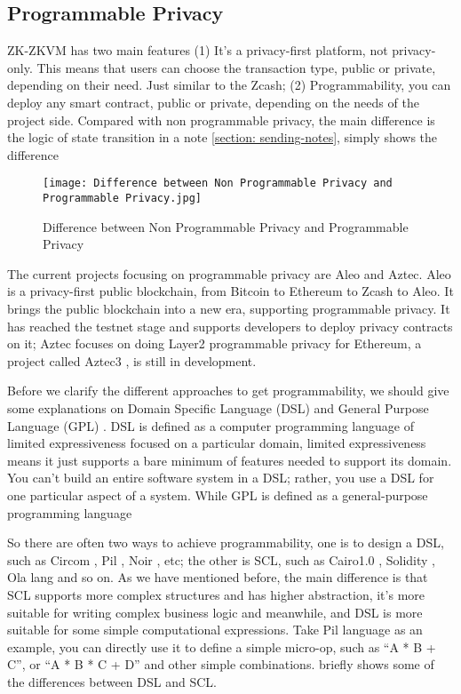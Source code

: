\subsection{Programmable Privacy}

ZK-ZKVM has two main features (1) It's a privacy-first platform, not privacy-only. This means that users can choose the transaction type, public or private, depending on their need. Just similar to the Zcash;
(2) Programmability, you can deploy any smart contract, public or private, depending on the needs of the project side. Compared with non programmable privacy, the main difference is the logic of state transition in a note \ref{section: sending-notes},  simply shows the difference 

\begin{figure}[!ht]
    \centering
    \texttt{[image: Difference between Non Programmable Privacy and Programmable Privacy.jpg]}
    \caption{Difference between Non Programmable Privacy and Programmable Privacy}
    \label{fig:Difference between Non Programmable Privacy and Programmable Privacy}
\end{figure}

The current projects focusing on programmable privacy are Aleo \cite{website:Aleo} and Aztec. Aleo is a 
privacy-first public blockchain, from Bitcoin \cite{website:BTC} to Ethereum to Zcash \cite{website:Zcash} to Aleo. It brings the public blockchain into a new era,
supporting programmable privacy. 
It has reached the testnet stage and supports developers to deploy privacy contracts on it; 
Aztec focuses on doing Layer2 programmable privacy for Ethereum, a project 
called Aztec3 \cite{website:Aztec3}, is still in development.

Before we clarify the different approaches to get programmability, we should give some explanations on Domain Specific Language (DSL) and General Purpose Language (GPL) \cite{website:DSL}.
DSL is defined as a computer programming language of limited expressiveness focused on a particular domain, limited expressiveness means it just supports a bare minimum of features 
needed to support its domain. You can't build an entire software system in a DSL; rather, you use a DSL for one particular aspect of a system. While GPL is defined as a general-purpose programming language

So there are often two ways to achieve programmability, one is to design a DSL, such as Circom \cite{website:Circom}, Pil \cite{website:Pil}, Noir \cite{website:Noir}, etc; the other is SCL, 
such as Cairo1.0 \cite{website:Cairo1.0}, Solidity \cite{website:Solidity}, Ola lang \cite{website:Ola-lang} and so on. As we have mentioned before, the main difference is that SCL supports more complex structures and has 
higher abstraction, it's more suitable for writing complex business logic and meanwhile, and DSL is more suitable for some simple computational expressions. 
Take Pil \cite{website:Pil} language as an example, you can directly use it to define a simple micro-op, such as ``A * B + C'', or ``A * B * C + D'' and other simple combinations. 
 briefly shows some of the differences between DSL and SCL.

